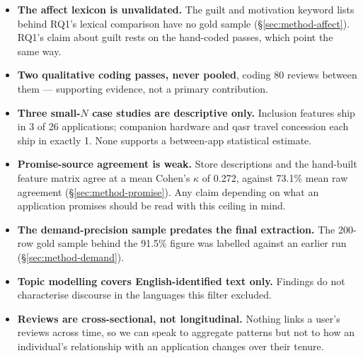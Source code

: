 \begin{itemize}
\item \textbf{The affect lexicon is unvalidated.} The guilt and motivation
keyword lists behind RQ1's lexical comparison have no gold sample
(\S\ref{sec:method-affect}). RQ1's claim about guilt rests on the hand-coded
passes, which point the same way.

\item \textbf{Two qualitative coding passes, never pooled}, coding 80
reviews between them --- supporting evidence, not a primary contribution.

\item \textbf{Three small-\(N\) case studies are descriptive only.} Inclusion
features ship in 3 of 26 applications; companion hardware and qasr travel
concession each ship in exactly 1. None supports a between-app statistical
estimate.

\item \textbf{Promise-source agreement is weak.} Store descriptions and the
hand-built feature matrix agree at a mean Cohen's \(\kappa\) of 0.272, against
73.1\% mean raw agreement (\S\ref{sec:method-promise}). Any claim depending on
what an application promises should be read with this ceiling in mind.

\item \textbf{The demand-precision sample predates the final extraction.} The
200-row gold sample behind the 91.5\% figure was labelled against an earlier
run (\S\ref{sec:method-demand}).

\item \textbf{Topic modelling covers English-identified text only.} Findings
do not characterise discourse in the languages this filter excluded.

\item \textbf{Reviews are cross-sectional, not longitudinal.} Nothing links a
user's reviews across time, so we can speak to aggregate patterns but not to
how an individual's relationship with an application changes over their
tenure.

\end{itemize}
